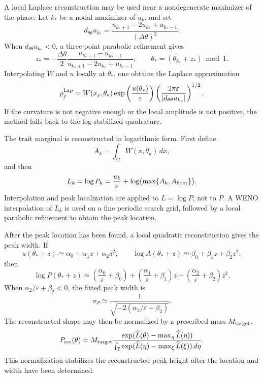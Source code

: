 \documentclass[11pt]{article}
\begin{document}
A local Laplace reconstruction may be used near a nondegenerate maximizer of
the phase.  Let \(k_*\) be a nodal maximizer of \(u_k\), and set
\[
    d_{\theta\theta}u_{k_*}
    =
    \frac{u_{k_*+1}-2u_{k_*}+u_{k_*-1}}{(\Delta\theta)^2}.
\]
When \(d_{\theta\theta}u_{k_*}<0\), a three-point parabolic refinement gives
\[
    z_*
    =
    -\frac{\Delta\theta}{2}
    \frac{u_{k_*+1}-u_{k_*-1}}
         {u_{k_*+1}-2u_{k_*}+u_{k_*-1}},
    \qquad
    \theta_*=(\theta_{k_*}+z_*)\bmod 1 .
\]
Interpolating \(W\) and \(u\) locally at \(\theta_*\), one obtains the Laplace
approximation
\begin{equation}
\label{eq:laplace_rho}
    \rho_j^{\rm Lap}
    =
    W(x_j,\theta_*)
    \exp\left(\frac{u(\theta_*)}{\varepsilon}\right)
    \left(\frac{2\pi\varepsilon}{|d_{\theta\theta}u_{k_*}|}\right)^{1/2}.
\end{equation}
If the curvature is not negative enough or the local amplitude is not positive,
the method falls back to the log-stabilized quadrature.

The trait marginal is reconstructed in logarithmic form.  First define
\[
    A_k=\int_\Omega W(x,\theta_k)\,dx,
\]
and then
\begin{equation}
\label{eq:appendix_logP}
    L_k=\log P_k
    =
    \frac{u_k}{\varepsilon}
    +
    \log\bigl(\max\{A_k,A_{\rm floor}\}\bigr).
\end{equation}
Interpolation and peak localization are applied to \(L=\log P\), not to
\(P\).  A WENO interpolation of \(L_k\) is used on a fine periodic search grid,
followed by a local parabolic refinement to obtain the peak location.

After the peak location has been found, a local quadratic reconstruction gives
the peak width.  If
\[
    u(\theta_*+z)\simeq \alpha_0+\alpha_1z+\alpha_2z^2,
    \qquad
    \log A(\theta_*+z)\simeq \beta_0+\beta_1z+\beta_2z^2,
\]
then
\[
    \log P(\theta_*+z)
    \simeq
    \left(\frac{\alpha_0}{\varepsilon}+\beta_0\right)
    +
    \left(\frac{\alpha_1}{\varepsilon}+\beta_1\right)z
    +
    \left(\frac{\alpha_2}{\varepsilon}+\beta_2\right)z^2 .
\]
When \(\alpha_2/\varepsilon+\beta_2<0\), the fitted peak width is
\begin{equation}
\label{eq:appendix_peak_width}
    \sigma_P
    \simeq
    \frac{1}{\sqrt{-2(\alpha_2/\varepsilon+\beta_2)}} .
\end{equation}
The reconstructed shape may then be normalized by a prescribed mass \(M_{\rm
target}\),
\begin{equation}
\label{eq:appendix_mass_shape}
    P_{\rm rec}(\theta)
    =
    M_{\rm target}
    \frac{
    \exp(\widehat L(\theta)-\max_\eta\widehat L(\eta))
    }
    {
    \int_{\mathbb T}
    \exp(\widehat L(\eta)-\max_\xi\widehat L(\xi))\,d\eta
    } .
\end{equation}
This normalization stabilizes the reconstructed peak height after the location
and width have been determined.
\end{document}
